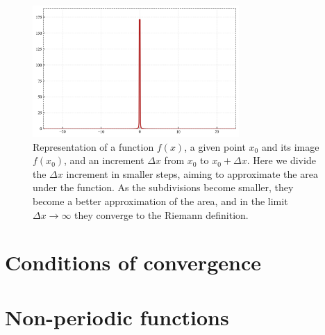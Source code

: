 \documentclass{book}
\begin{document}
\begin{figure}[ht]
    \centering
    \includegraphics[width=0.7\textwidth]{figures/appendix/fourier_transform_3.png}
    \caption{Representation of a function $f(x)$, a given point $x_0$ and its image $f(x_0)$, and an increment $\Delta x$ from $x_0$ to $x_0 + \Delta x$. Here we divide the $\Delta x$ increment in smaller steps, aiming to approximate the area under the function. As the subdivisions become smaller, they become a better approximation of the area, and in the limit $\Delta x \rightarrow \infty$ they converge to the Riemann definition.}
    \label{fig:fourier_transform_3}
\end{figure}

\section{Conditions of convergence}

\section{Non-periodic functions}

\backmatter
 
\end{document}
